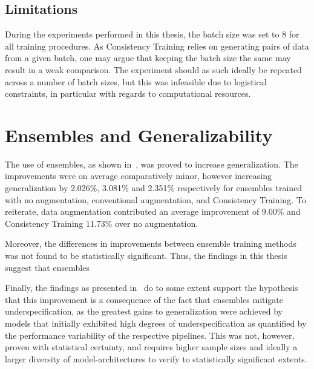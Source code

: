 \subsection{Limitations}
    During the experiments performed in this thesis, the batch size was set to 8 for all training procedures. As Consistency Training relies on generating pairs of data from a given batch, one may argue that keeping the batch size the same may result in a weak comparison. The experiment should as such ideally be repeated across a number of batch sizes, but this was infeasible due to logistical constraints, in particular with regards to computational resources. 


\section{Ensembles and Generalizability}
    The use of ensembles, as shown in~, was proved to increase generalization. The improvements were on average comparatively minor, however increasing generalization by 2.026\%, 3.081\% and 2.351\% respectively for ensembles trained with no augmentation, conventional augmentation, and Consistency Training.  To reiterate, data augmentation contributed an average improvement of 9.00\% and Consistency Training 11.73\% over no augmentation. 
    
    Moreover, the differences in improvements between ensemble training methods was not found to be statistically significant. Thus, the findings in this thesis suggest that ensembles 
    
    
    
    Finally, the findings as presented in~ do to some extent support the hypothesis that this improvement is a consequence of the fact that ensembles mitigate underspecification, as the greatest gains to generalization were achieved by models that initially exhibited high degrees of underspecification as quantified by the performance variability of the respective pipelines. This was not, however, proven with statistical certainty, and requires higher sample sizes and ideally a larger diversity of model-architectures to verify to statistically significant extents.  

    
